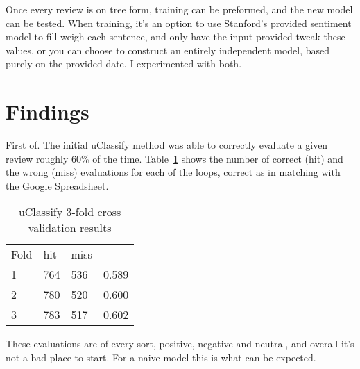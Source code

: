 \documentclass{sig-alternate}
\begin{document}
Once every review is on tree form, training can be preformed, and the new model can be tested. When training, it's an option to use Stanford's provided sentiment model to fill weigh each sentence, and only have the input provided tweak these values, or you can choose to construct an entirely independent model, based purely on the provided date. I experimented with both.
\section{Findings}
\label{section:findings}
First of. The initial uClassify method was able to correctly evaluate a given review roughly 60\% of the time. Table~\ref{table:uClassify} shows the number of correct (hit) and the wrong (miss) evaluations for each of the loops, correct as in matching with the Google Spreadsheet.
\begin{table}[h!]
\centering
\caption{uClassify 3-fold cross validation results}
\begin{tabular}{l l l l}
Fold & hit & miss &\\
1 & 764 & 536 &0.589\\
2 & 780 & 520 & 0.600\\
3 & 783 & 517 & 0.602
\end{tabular}
\label{table:uClassify}
\end{table}
These evaluations are of every sort, positive, negative and neutral, and overall it's not a bad place to start. For a naive model this is what can be expected.\\
~\\
\end{document}
